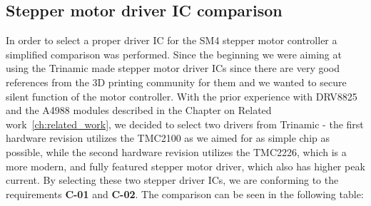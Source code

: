 \subsection{Stepper motor driver IC comparison}
\label{subsec:stepper_ic}
In order to select a proper driver IC for the SM4 stepper motor controller a simplified comparison was performed.
Since the beginning we were aiming at using the Trinamic made stepper motor driver ICs since there are very good references from the 3D printing community\cite{josef_prusa_original_2017,josef_prusa_original_2019,3daddict_stepper_2020}  for them and we wanted to secure silent function of the motor controller.
With the prior experience with DRV8825 and the A4988 modules described in the Chapter on Related work~\ref{ch:related_work}, we decided to select two drivers from Trinamic - the first hardware revision utilizes the TMC2100 as we aimed for as simple chip as possible, while the second hardware revision utilizes the TMC2226, which is a more modern, and fully featured stepper motor driver, which also has higher peak current.
By selecting these two stepper driver ICs, we are conforming to the requirements \textbf{C-01} and \textbf{C-02}.
The comparison can be seen in the following table:

